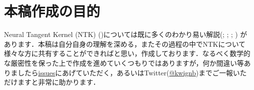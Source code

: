 \section{本稿作成の目的}
Neural Tangent Kernel (NTK) (\citealp{jacot2018neural})については既に多くのわかり易い解説(\citealp{rajat2019ntk}; \citealp{甘利俊一2019情報幾何学の新展開}; \citealp{TaijiSuzuki2019theory}; \citealp{Osaka2020ntk}) があります．本稿は自分自身の理解を深める，またその過程の中でNTKについて様々な方に共有することができればと思い，作成しております．なるべく数学的な厳密性を保った上で作成を進めていくつもりではありますが，何か間違い等ありましたら\href{https://github.com/kwignb/Neural-Tangent-Kernel/issues}{issues}にあげていただく，あるいはTwitter(\href{https://twitter.com/sysc_kt}{@kwignb})までご一報いただけますと非常に助かります．